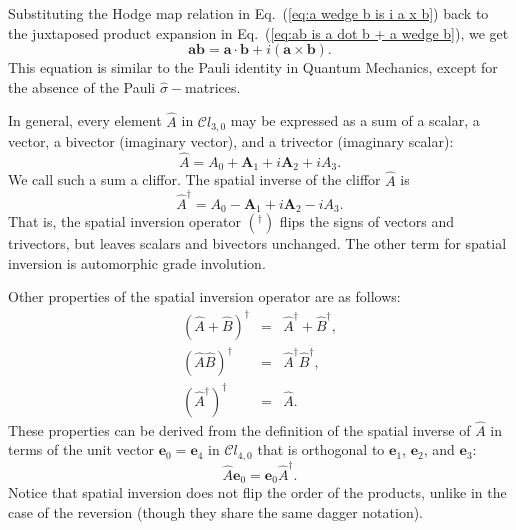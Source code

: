 \documentclass[11pt,twocolumn]{article}
\begin{document}
Substituting the Hodge map relation in Eq.~(\ref{eq:a wedge b is i a x b}) back to the juxtaposed product expansion in Eq.~(\ref{eq:ab is a dot b + a wedge b}), we get\cite{Hestenes_2003_ajpv71i2pp104-121_p110}
\begin{equation}
\label{eq:ab is a dot b + i axb}
\mathbf a\mathbf b=\mathbf a\cdot\mathbf b + i(\mathbf a\times\mathbf b).
\end{equation}
This equation is similar to the Pauli identity in Quantum Mechanics, except for the absence of the Pauli $\hat\sigma-$matrices.

In general, every element $\hat A$ in $\mathcal Cl_{3,0}$ may be expressed as a sum of a scalar, a vector, a bivector (imaginary vector), and a trivector (imaginary scalar):\cite{Hestenes_2003_ajpv71i2pp104-121_p110}
\begin{equation}
\label{eq:A}
\hat A=A_0+\mathbf A_1+i\mathbf A_2+iA_3.
\end{equation}
We call such a sum a cliffor.  The spatial inverse of the cliffor $\hat A$ is\cite{SugonMcNamara_2008_arXiv:0807.1382v1_p2} 
\begin{equation}
\label{eq:A dagger is A_0 - A_1 + iA_2 - iA_3}
\hat A^\dagger =A_0-\mathbf A_1+i\mathbf A_2-iA_3.
\end{equation}
That is, the spatial inversion operator $(^\dagger)$ flips the signs of vectors and trivectors, but leaves scalars and bivectors unchanged.  The other term for spatial inversion is automorphic grade involution\cite{Baylis_1996_CliffordGeometricAlgebras_p4}.

Other properties of the spatial inversion operator are as follows:
\begin{eqnarray}
\label{eq:A + B dagger distribute}
(\hat A+\hat B)^\dagger&=&\hat A^\dagger+\hat B^\dagger,\\
\label{eq:AB dagger distribute}
(\hat A\hat B)^\dagger&=&\hat A^\dagger\hat B^\dagger,\\
\label{eq:A dagger dagger is A}
(\hat A^\dagger)^\dagger&=&\hat A.
\end{eqnarray}
These properties can be derived from the definition of the spatial inverse of $\hat A$ in terms of the unit vector $\mathbf e_0=\mathbf e_4$ in $\mathcal Cl_{4,0}$ that is orthogonal to $\mathbf e_1$, $\mathbf e_2$, and $\mathbf e_3$:\cite{SugonMcNamara_2008_arXiv:0807.1382v1_p2}
\begin{equation}
\label{eq:Ae_0 is e_0A dagger}
\hat A\mathbf e_0=\mathbf e_0\hat A^\dagger.
\end{equation}
Notice that spatial inversion does not flip the order of the products, unlike in the case of the reversion \cite{Vold_1993_ajp61i6pp491-504_p499} (though they share the same dagger notation).  
\end{document}
